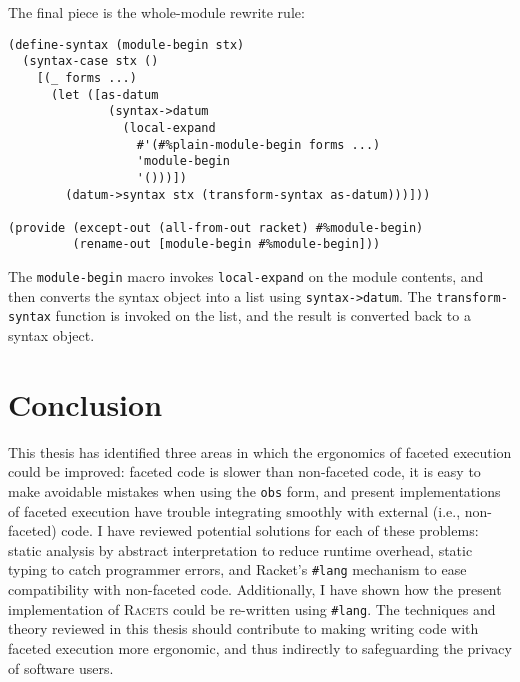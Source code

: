 \documentclass{article}
\begin{document}
The final piece is the whole-module rewrite rule:

\begin{lstlisting}
(define-syntax (module-begin stx)
  (syntax-case stx ()
    [(_ forms ...)
      (let ([as-datum
              (syntax->datum
                (local-expand
                  #'(#%plain-module-begin forms ...)
                  'module-begin
                  '()))])
        (datum->syntax stx (transform-syntax as-datum)))]))

(provide (except-out (all-from-out racket) #%module-begin)
         (rename-out [module-begin #%module-begin]))
\end{lstlisting}

The \texttt{module-begin} macro invokes \texttt{local-expand} on the module contents, and then converts the syntax object into a list using \texttt{syntax->datum}. The \texttt{transform-syntax} function is invoked on the list, and the result is converted back to a syntax object.



\section{Conclusion}
This thesis has identified three areas in which the ergonomics of faceted execution could be improved: faceted code is slower than non-faceted code, it is easy to make avoidable mistakes when using the \texttt{obs} form, and present implementations of faceted execution have trouble integrating smoothly with external (i.e., non-faceted) code. I have reviewed potential solutions for each of these problems: static analysis by abstract interpretation to reduce runtime overhead, static typing to catch programmer errors, and Racket's \texttt{\#lang} mechanism to ease compatibility with non-faceted code. Additionally, I have shown how the present implementation of \textsc{Racets} could be re-written using \texttt{\#lang}. The techniques and theory reviewed in this thesis should contribute to making writing code with faceted execution more ergonomic, and thus indirectly to safeguarding the privacy of software users.


\end{document}
